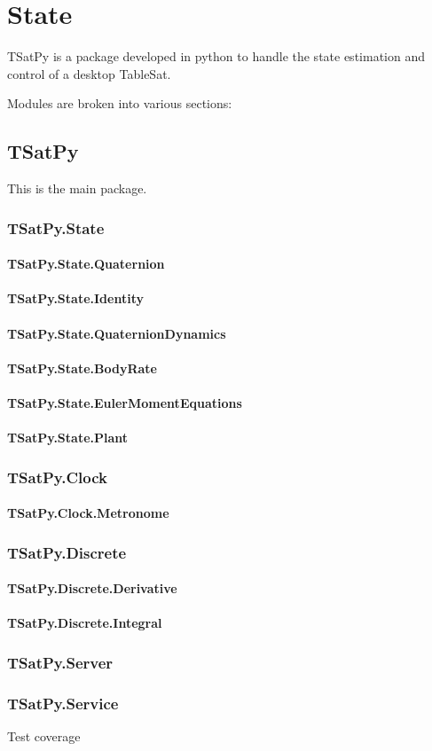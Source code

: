 
\chapter{State}
\label{chap:State}


TSatPy is a package developed in python to handle the state estimation and control of a desktop TableSat.

Modules are broken into various sections:

\section{TSatPy}

This is the main package.

\subsection{TSatPy.State}

\subsubsection{TSatPy.State.Quaternion}
\subsubsection{TSatPy.State.Identity}
\subsubsection{TSatPy.State.QuaternionDynamics}
\subsubsection{TSatPy.State.BodyRate}
\subsubsection{TSatPy.State.EulerMomentEquations}
\subsubsection{TSatPy.State.Plant}
\subsection{TSatPy.Clock}
\subsubsection{TSatPy.Clock.Metronome}
\subsection{TSatPy.Discrete}
\subsubsection{TSatPy.Discrete.Derivative}
\subsubsection{TSatPy.Discrete.Integral}
\subsection{TSatPy.Server}
\subsection{TSatPy.Service}

Test coverage


